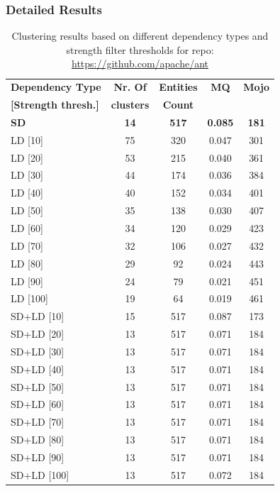 \documentclass{ieeeaccess}
\begin{document}
\subsubsection{Detailed Results}



\begin{table}
\caption{Clustering results based on different dependency types and strength filter thresholds for repo: \url{https://github.com/apache/ant}}
\label{tab:clustering_results_ant}
\centering
\setlength{\tabcolsep}{3pt}
\begin{tabular}{|l|c|c|c|c|}
\hline
\textbf{Dependency Type} & \textbf{Nr. Of} & \textbf{Entities} & \textbf{MQ} & \textbf{Mojo} \\
\textbf{[Strength thresh.]} & \textbf{clusters} & \textbf{Count} &  &  \\
\hline
\textbf{SD} & \textbf{14} & \textbf{517} & \textbf{0.085} & \textbf{181} \\
\hline
LD [10] & 75 & 320 & 0.047 & 301 \\
LD [20] & 53 & 215 & 0.040 & 361 \\
LD [30] & 44 & 174 & 0.036 & 384 \\
LD [40] & 40 & 152 & 0.034 & 401 \\
LD [50] & 35 & 138 & 0.030 & 407 \\
LD [60] & 34 & 120 & 0.029 & 423 \\
LD [70] & 32 & 106 & 0.027 & 432 \\
LD [80] & 29 & 92 & 0.024 & 443 \\
LD [90] & 24 & 79 & 0.021 & 451 \\
LD [100] & 19 & 64 & 0.019 & 461 \\
\hline
SD+LD [10] & 15 & 517 & 0.087 & 173 \\
SD+LD [20] & 13 & 517 & 0.071 & 184 \\
SD+LD [30] & 13 & 517 & 0.071 & 184 \\
SD+LD [40] & 13 & 517 & 0.071 & 184 \\
SD+LD [50] & 13 & 517 & 0.071 & 184 \\
SD+LD [60] & 13 & 517 & 0.071 & 184 \\
SD+LD [70] & 13 & 517 & 0.071 & 184 \\
SD+LD [80] & 13 & 517 & 0.071 & 184 \\
SD+LD [90] & 13 & 517 & 0.071 & 184 \\
SD+LD [100] & 13 & 517 & 0.072 & 184 \\
\hline
\end{tabular}
\end{table}
\end{document}
